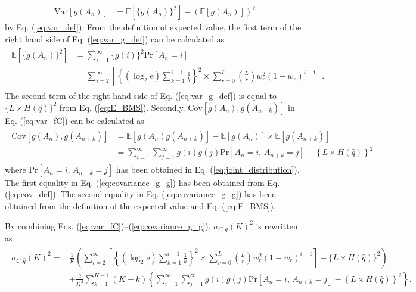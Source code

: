 \documentclass[dvipdfmx,english]{ampmt} %
\begin{document}
\begin{align}\label{eq:var_g_def}
  \mathrm{Var}[g(A_n)] 
  &= \mathbb{E}[\{g(A_n)\}^2] - (\mathbb{E}[g(A_n)])^2 
\end{align}
by Eq. (\ref{eq:var_def}). From the definition of expected value, the first term of the right hand side of Eq. (\ref{eq:var_g_def}) can be calculated as
\begin{align}\begin{split}\label{eq:expectation_g_An_square}
  \mathbb{E}[\{g(A_n)\}^2] &= \sum_{i=1}^{\infty} \{g(i)\}^2 \mathrm{Pr}[A_n=i]\\
  &=\sum_{i=2}^{\infty} \left[\left\{ (\log_2 \mathrm{e}) \sum_{k=1}^{i-1} \frac{1}{k} \right\}^2 \times \sum_{r=0}^{L} \binom{L}{r} w_r^2 (1-w_r)^{i-1}\right]. 
\end{split}\end{align}
The second term of the right hand side of Eq. (\ref{eq:var_g_def}) is equal to $\{L \times H(\hat{q})\}^2$ from Eq. (\ref{eq:E_BMS}).
%
Secondly, $\mathrm{Cov}[g(A_n),g(A_{n+k})]$ in Eq. (\ref{eq:var_fC}) can be calculated as
\begin{align}\label{eq:covariance_g_g}
\begin{split}
  \mathrm{Cov}[g(A_n),g(A_{n+k})] 
  &= \mathbb{E}[g(A_n) g(A_{n+k})] - \mathbb{E}[g(A_n)]\times\mathbb{E}[g(A_{n+k})] \\
  &= \sum_{i=1}^{\infty}\sum_{j=1}^{\infty}g(i)g(j)\mathrm{Pr}[A_n=i, \, A_{n+k}=j] - \left\{L \times H(\hat{q})\right\}^2
\end{split}
\end{align}
where $\mathrm{Pr}[A_n=i, \, A_{n+k}=j]$ has been obtained in Eq. (\ref{eq:joint_distribution}).
The first equality in Eq. (\ref{eq:covariance_g_g}) has been obtained from Eq. (\ref{eq:cov_def}). The second equality in Eq. (\ref{eq:covariance_g_g}) has been obtained from the definition of the expected value and Eq. (\ref{eq:E_BMS}).
\par
By combining Eqs. (\ref{eq:var_fC})--(\ref{eq:covariance_g_g}), $\sigma_{C,q}(K)^2$ is rewritten as
\begin{align}\begin{split}\label{eq:sigma_C^2}
  \sigma_{C,\hat{q}}(K)^2  
  =& \frac{1}{K} \left( \sum_{i=2}^{\infty} \left[\left\{ (\log_2 \mathrm{e}) \sum_{k=1}^{i-1} \frac{1}{k} \right\}^2 \times \sum_{r=0}^{L} \binom{L}{r} w_r^2 (1-w_r)^{i-1}\right] - \{L \times H(\hat{q})\}^2 \right)\\
  &+ \frac{2}{K^2}\sum_{k=1}^{K-1}(K-k) \left\{\sum_{i=1}^{\infty}\sum_{j=1}^{\infty}g(i)g(j)\mathrm{Pr}[A_n=i, \, A_{n+k}=j] - \left\{L \times H(\hat{q})\right\}^2\right\}.
\end{split}\end{align}
\clearpage
\end{document}
